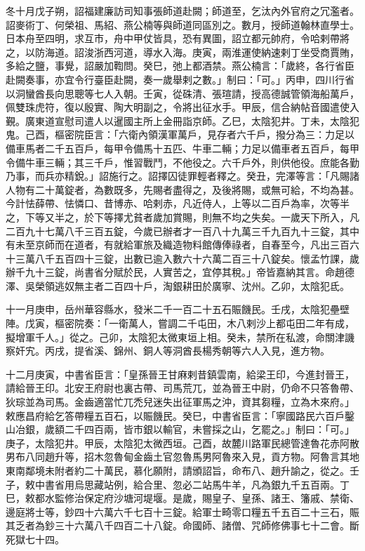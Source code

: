 \begin{pinyinscope}
 冬十月戊子朔，詔福建廉訪司知事張師道赴闕；師道至，乞汰內外官府之冗濫者。詔麥術丁、何榮祖、馬紹、燕公楠等與師道同區別之。數月，授師道翰林直學士。日本舟至四明，求互市，舟中甲仗皆具，恐有異圖，詔立都元帥府，令哈剌帶將之，以防海道。詔浚浙西河道，導水入海。庚寅，兩淮運使納速剌丁坐受商賈賄，多給之鹽，事覺，詔嚴加鞫問。癸巳，弛上都酒禁。燕公楠言：「歲終，各行省臣赴闕奏事，亦宜令行臺臣赴闕，奏一歲舉剌之數。」制曰：「可。」丙申，四川行省以洞蠻酋長向思聰等七人入朝。壬寅，從硃清、張瑄請，授高德誠管領海船萬戶，佩雙珠虎符，復以殷實、陶大明副之，令將出征水手。甲辰，信合納帖音國遣使入覲。廣東道宣慰司遣人以暹國主所上金冊詣京師。乙巳，太陰犯井。丁未，太陰犯鬼。己酉，樞密院臣言：「六衛內領漢軍萬戶，見存者六千戶，撥分為三：力足以備車馬者二千五百戶，每甲令備馬十五匹、牛車二輛；力足以備車者五百戶，每甲令備牛車三輛；其三千戶，惟習戰鬥，不他役之。六千戶外，則供他役。庶能各勤乃事，而兵亦精銳。」詔施行之。詔擇囚徒罪輕者釋之。癸丑，完澤等言：「凡賜諸人物有二十萬錠者，為數既多，先賜者盡得之，及後將賜，或無可給，不均為甚。今計怯薛帶、怯憐口、昔博赤、哈剌赤，凡近侍人，上等以二百戶為率，次等半之，下等又半之，於下等擇尤貧者歲加賞賜，則無不均之失矣。一歲天下所入，凡二百九十七萬八千三百五錠，今歲已辦者才一百八十九萬三千九百九十三錠，其中有未至京師而在道者，有就給軍旅及織造物料館傳俸祿者，自春至今，凡出三百六十三萬八千五百四十三錠，出數已逾入數六十六萬二百三十八錠矣。懷孟竹課，歲辦千九十三錠，尚書省分賦於民，人實苦之，宜停其稅。」帝皆嘉納其言。命趙德澤、吳榮領逃奴無主者二百四十戶，淘銀耕田於廣寧、沈州。乙卯，太陰犯氐。



 十一月庚申，岳州華容縣水，發米二千一百二十五石賑饑民。壬戌，太陰犯壘壁陣。戊寅，樞密院奏：「一衛萬人，嘗調二千屯田，木八剌沙上都屯田二年有成，擬增軍千人。」從之。己卯，太陰犯太微東垣上相。癸未，禁所在私渡，命關津譏察奸宄。丙戌，提省溪、錦州、銅人等洞酋長楊秀朝等六人入見，進方物。



 十二月庚寅，中書省臣言：「皇孫晉王甘麻剌昔鎮雲南，給梁王印，今進封晉王，請給晉王印。北安王府尉也裏古帶、司馬荒兀，並為晉王中尉，仍命不只答魯帶、狄琮並為司馬。金齒適當忙兀禿兒迷失出征軍馬之沖，資其芻糧，立為木來府。」敕應昌府給乞答帶糧五百石，以賑饑民。癸巳，中書省臣言：「寧國路民六百戶鑿山冶銀，歲額二千四百兩，皆市銀以輸官，未嘗採之山，乞罷之。」制曰：「可。」庚子，太陰犯井。甲辰，太陰犯太微西垣。己酉，故麓川路軍民總管達魯花赤阿散男布八同趙升等，招木忽魯甸金齒土官忽魯馬男阿魯來入見，貢方物。阿魯言其地東南鄰境未附者約二十萬民，慕化願附，請頒詔旨，命布八、趙升諭之，從之。壬子，敕中書省用烏思藏站例，給合里、忽必二站馬牛羊，凡為銀九千五百兩。丁巳，敕都水監修治保定府沙塘河堤堰。是歲，賜皇子、皇孫、諸王、籓戚、禁衛、邊庭將士等，鈔四十六萬六千七百十三錠。給軍士畸零口糧五千五百二十三石，賑其乏者為鈔三十六萬八千四百二十八錠。命國師、諸僧、咒師修佛事七十二會。斷死獄七十四。




\end{pinyinscope}
